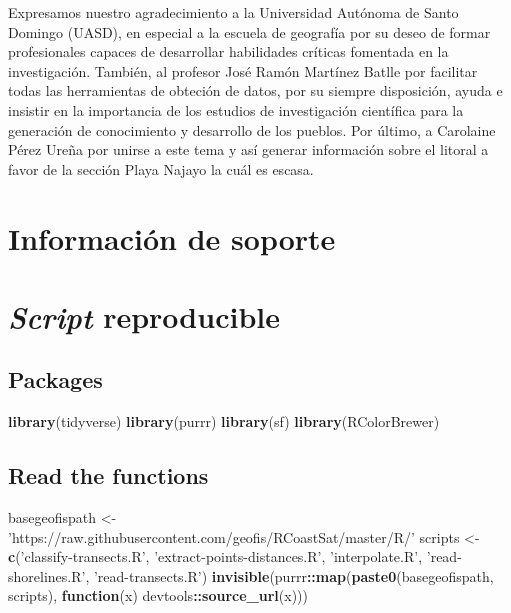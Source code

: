 \documentclass[11pt,]{article}
\newenvironment{Shaded}{\begin{snugshade}}{\end{snugshade}}
\newcommand{\KeywordTok}[1]{\textcolor[rgb]{0.13,0.29,0.53}{\textbf{#1}}}
\newcommand{\StringTok}[1]{\textcolor[rgb]{0.31,0.60,0.02}{#1}}
\newcommand{\ControlFlowTok}[1]{\textcolor[rgb]{0.13,0.29,0.53}{\textbf{#1}}}
\newcommand{\OperatorTok}[1]{\textcolor[rgb]{0.81,0.36,0.00}{\textbf{#1}}}
\newcommand{\NormalTok}[1]{#1}
\begin{document}
Expresamos nuestro agradecimiento a la Universidad Autónoma de Santo
Domingo (UASD), en especial a la escuela de geografía por su deseo de
formar profesionales capaces de desarrollar habilidades críticas
fomentada en la investigación. También, al profesor José Ramón Martínez
Batlle por facilitar todas las herramientas de obteción de datos, por su
siempre disposición, ayuda e insistir en la importancia de los estudios
de investigación científica para la generación de conocimiento y
desarrollo de los pueblos. Por último, a Carolaine Pérez Ureña por
unirse a este tema y así generar información sobre el litoral a favor de
la sección Playa Najayo la cuál es escasa.

\section{Información de soporte}\label{informaciuxf3n-de-soporte}

\section{\texorpdfstring{\emph{Script}
reproducible}{Script reproducible}}\label{script-reproducible}

\subsection{Packages}\label{packages}

\begin{Shaded}
\begin{Highlighting}[]
\KeywordTok{library}\NormalTok{(tidyverse)}
\KeywordTok{library}\NormalTok{(purrr)}
\KeywordTok{library}\NormalTok{(sf)}
\KeywordTok{library}\NormalTok{(RColorBrewer)}
\end{Highlighting}
\end{Shaded}

\subsection{Read the functions}\label{read-the-functions}

\begin{Shaded}
\begin{Highlighting}[]
\NormalTok{basegeofispath <-}\StringTok{ 'https://raw.githubusercontent.com/geofis/RCoastSat/master/R/'}
\NormalTok{scripts <-}\StringTok{ }\KeywordTok{c}\NormalTok{(}\StringTok{'classify-transects.R'}\NormalTok{, }\StringTok{'extract-points-distances.R'}\NormalTok{,}
             \StringTok{'interpolate.R'}\NormalTok{, }\StringTok{'read-shorelines.R'}\NormalTok{, }\StringTok{'read-transects.R'}\NormalTok{)}
\KeywordTok{invisible}\NormalTok{(purrr}\OperatorTok{::}\KeywordTok{map}\NormalTok{(}\KeywordTok{paste0}\NormalTok{(basegeofispath, scripts), }\ControlFlowTok{function}\NormalTok{(x) devtools}\OperatorTok{::}\KeywordTok{source_url}\NormalTok{(x)))}
\end{Highlighting}
\end{Shaded}
\end{document}
